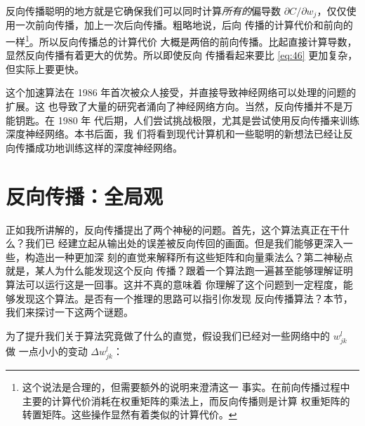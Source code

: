 反向传播聪明的地方就是它确保我们可以同时计算\emph{所有的}偏导数
$\partial C/\partial w_j$，仅仅使用一次前向传播，加上一次后向传播。粗略地说，后向
传播的计算代价和前向的一样\footnote{这个说法是合理的，但需要额外的说明来澄清这一
  事实。在前向传播过程中主要的计算代价消耗在权重矩阵的乘法上，而反向传播则是计算
  权重矩阵的转置矩阵。这些操作显然有着类似的计算代价。}。所以反向传播总的计算代价
大概是两倍的前向传播。比起直接计算导数，显然反向传播有着更大的优势。所以即使反向
传播看起来要比 \eqref{eq:46} 更加复杂，但实际上要更快。

这个加速算法在 1986 年首次被众人接受，并直接导致神经网络可以处理的问题的扩展。这
也导致了大量的研究者涌向了神经网络方向。当然，反向传播并不是万能钥匙。在 1980 年
代后期，人们尝试挑战极限，尤其是尝试使用反向传播来训练深度神经网络。本书后面，我
们将看到现代计算机和一些聪明的新想法已经让反向传播成功地训练这样的深度神经网络。

\section{反向传播：全局观}
\label{sec:backpropagation_the_big_picture}

正如我所讲解的，反向传播提出了两个神秘的问题。首先，这个算法真正在干什么？我们已
经建立起从输出处的误差被反向传回的画面。但是我们能够更深入一些，构造出一种更加深
刻的直觉来解释所有这些矩阵和向量乘法么？第二神秘点就是，某人为什么能发现这个反向
传播？跟着一个算法跑一遍甚至能够理解证明算法可以运行这是一回事。这并不真的意味着
你理解了这个问题到一定程度，能够发现这个算法。是否有一个推理的思路可以指引你发现
反向传播算法？本节，我们来探讨一下这两个谜题。

为了提升我们关于算法究竟做了什么的直觉，假设我们已经对一些网络中的 $w_{jk}^l$ 做
一点小小的变动 $\Delta w_{jk}^l$：

